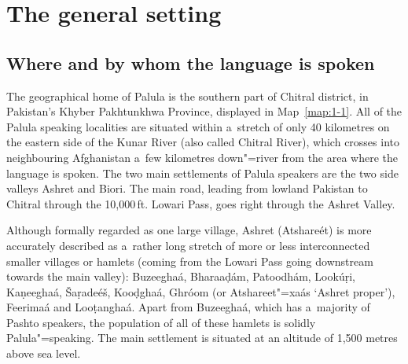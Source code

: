 \section{The general setting}
\label{sec:1-2}
\subsection{Where and by whom the language is spoken}
\label{subsec:1-2-1}

The geographical home of Palula is the southern part of Chitral district, in Pakistan's Khyber Pakhtunkhwa Province, displayed in Map~\ref{map:1-1}. All of the Palula speaking localities are
situated within a~stretch of only 40 kilometres on the eastern side of the Kunar River (also called
Chitral River), which crosses into neighbouring Afghanistan a~few kilometres down"=river from the
area where the language is spoken. The two main settlements of Palula speakers are the two side valleys Ashret and Biori. The main road, leading from lowland Pakistan to Chitral through the 10,000\,ft. Lowari Pass, goes right through the Ashret Valley. 


Although formally regarded as one large village, Ashret (Atshareét) is more accurately described as a~rather long stretch of more or less interconnected smaller villages or hamlets (coming from the Lowari Pass going downstream towards the main valley): Buzeeghaá, Bharaaḍám, Patoodhám, Lookúṛi, Kaṇeeghaá, Šaṛadeéš, Kooḍghaá, Ghróom (or Atshareet"=xaás `Ashret proper'), Feerimaá and Looṭanghaá. Apart from Buzeeghaá, which has a~majority of Pashto speakers, the population of all of these hamlets is solidly Palula"=speaking. The main settlement is situated at an altitude of 1,500 metres above sea level.

